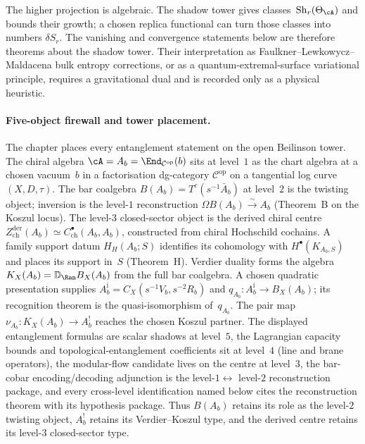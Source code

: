 The higher projection is algebraic.  The shadow tower gives
classes~$\Sh_r(\Theta_\cA)$ and bounds their growth; a chosen
replica functional can turn those classes into numbers
$\delta S_r$.  The vanishing and convergence statements below are
therefore theorems about the shadow tower.  Their interpretation as
Faulkner--Lewkowycz--Maldacena bulk entropy corrections, or as a
quantum-extremal-surface variational principle, requires a
gravitational dual and is recorded only as a physical heuristic.

\paragraph{Five-object firewall and tower placement.}
The chapter places every entanglement statement on the open Beilinson
tower.  The chiral algebra $\cA=A_b=\End_{\mathcal C^{\mathrm{op}}}(b)$
sits at level~$1$ as the chart algebra at a chosen vacuum~$b$ in a
factorisation dg-category $\mathcal C^{\mathrm{op}}$ on a tangential
log curve $(X,D,\tau)$.  The bar coalgebra
$B(A_b)=T^c(s^{-1}\bar A_b)$ at level~$2$ is the twisting object;
inversion is the level-$1$ reconstruction
$\Omega B(A_b)\xrightarrow{\sim}A_b$ (Theorem~B on the Koszul
locus). The level-$3$ closed-sector
object is the derived chiral centre
$Z^{\mathrm{der}}_{\mathrm{ch}}(A_b)
\simeq C^\bullet_{\mathrm{ch}}(A_b,A_b)$,
constructed from chiral Hochschild cochains.  A family support datum
$H_H(A_b;S)$ identifies its cohomology with
$H^\bullet(K_{A_b,S})$ and places its support in~$S$
(Theorem~H).  Verdier duality
 forms the algebra
$K_X(A_b)=\mathbb D_{\Ran}B_X(A_b)$ from the full bar coalgebra.
A chosen quadratic presentation supplies
$A_b^{\mathrm i}=C_X(s^{-1}V_b,s^{-2}R_b)$ and
$q_{A_b}\colon A_b^{\mathrm i}\to B_X(A_b)$; its recognition theorem is
the quasi-isomorphism of~$q_{A_b}$.  The pair map
$\nu_{A_b}\colon K_X(A_b)\to A_b^!$ reaches the chosen Koszul partner.
The
displayed entanglement formulas are scalar shadows at level~$5$, the
Lagrangian capacity bounds and topological-entanglement coefficients
sit at level~$4$ (line and brane operators), the modular-flow
candidate lives on the centre at level~$3$, the bar-cobar
encoding/decoding adjunction is the level-$1$$\leftrightarrow$
level-$2$ reconstruction package, and every cross-level identification
named below cites the reconstruction theorem with its hypothesis
package. Thus $B(A_b)$ retains its role as the level-$2$ twisting
object, $A_b^!$ retains its Verdier--Koszul type, and the derived
centre retains its level-$3$ closed-sector type.

